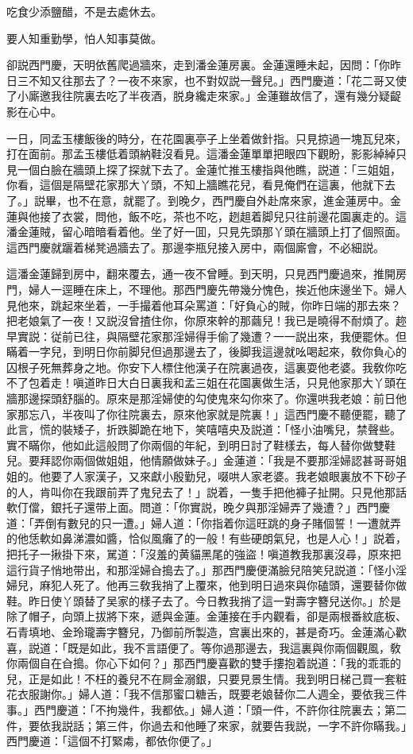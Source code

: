 吃食少添鹽醋，不是去處休去。

要人知重勤學，怕人知事莫做。

卻説西門慶，天明依舊爬過牆來，走到潘金蓮房裏。金蓮還睡未起，因問：「你昨日三不知又往那去了？一夜不來家，也不對奴説一聲兒。」西門慶道：「花二哥又使了小廝邀我往院裏去吃了半夜酒，脱身纔走來家。」金蓮雖故信了，還有幾分疑齪影在心中。

一日，同孟玉樓飯後的時分，在花園裏亭子上坐着做針指。只見掠過一塊瓦兒來，打在面前。那孟玉樓低着頭納鞋沒看見。這潘金蓮單單把眼四下觀盼，影影綽綽只見一個白臉在牆頭上探了探就下去了。金蓮忙推玉樓指與他瞧，説道：「三姐姐，你看，這個是隔壁花家那大丫頭，不知上牆瞧花兒，看見俺們在這裏，他就下去了。」説畢，也不在意，就罷了。到晚夕，西門慶自外赴席來家，進金蓮房中。金蓮與他接了衣裳，問他，飯不吃，茶也不吃，趔趄着脚兒只往前邊花園裏走的。這潘金蓮賊，留心暗暗看着他。坐了好一囬，只見先頭那丫頭在牆頭上打了個照面。這西門慶就躧着梯凳過牆去了。那邊李瓶兒接入房中，兩個廝會，不必細説。

這潘金蓮歸到房中，翻來覆去，通一夜不曾睡。到天明，只見西門慶過來，推開房門，婦人一逕睡在床上，不理他。那西門慶先帶幾分愧色，挨近他床邊坐下。婦人見他來，跳起來坐着，一手撮着他耳朵罵道：「好負心的賊，你昨日端的那去來？把老娘氣了一夜！又説沒曾揸住你，你原來幹的那繭兒！我已是曉得不耐煩了。趂早實説：従前已往，與隔壁花家那淫婦得手偷了幾遭？一一説出來，我便罷休。但瞞着一字兒，到明日你前脚兒但過那邊去了，後脚我這邊就吆喝起來，敎你負心的囚根子死無葬身之地。你安下人標住他漢子在院裏過夜，這裏耍他老婆。我敎你吃不了包着走！嗔道昨日大白日裏我和孟三姐在花園裏做生活，只見他家那大丫頭在牆那邊探頭舒腦的。原來是那淫婦使的勾使鬼來勾你來了。你還哄我老娘：前日他家那忘八，半夜叫了你往院裏去，原來他家就是院裏！」這西門慶不聽便罷，聽了此言，慌的裝矮子，折跌脚跪在地下，笑嘻嘻央及説道：「怪小油嘴兒，禁聲些。實不瞞你，他如此這般問了你兩個的年紀，到明日討了鞋樣去，每人替你做雙鞋兒。要拜認你兩個做姐姐，他情願做妹子。」金蓮道：「我是不要那淫婦認甚哥哥姐姐的。他要了人家漢子，又來獻小殷勤兒，啜哄人家老婆。我老娘眼裏放不下砂子的人，肯叫你在我跟前弄了鬼兒去了！」説着，一隻手把他褲子扯開。只見他那話軟仃儅，銀托子還带上面。問道：「你實説，晚夕與那淫婦弄了幾遭？」西門慶道：「弄倒有數兒的只一遭。」婦人道：「你指着你這旺跳的身子賭個誓！一遭就弄的他恁軟如鼻涕濃如醬，恰似風癱了的一般！有些硬朗氣兒，也是人心！」説着，把托子一揪掛下來，駡道：「沒羞的黄貓黑尾的強盜！嗔道教我那裏沒尋，原來把這行貨子悄地带出，和那淫婦㒲搗去了。」那西門慶便滿臉兒陪笑兒説道：「怪小淫婦兒，麻犯人死了。他再三敎我捎了上覆來，他到明日過來與你磕頭，還要替你做鞋。昨日使丫頭替了吴家的樣子去了。今日教我捎了這一對壽字簪兒送你。」於是除了帽子，向頭上拔將下來，遞與金蓮。金蓮接在手内觀看，卻是兩根番紋底板、石青填地、金玲瓏壽字簪兒，乃御前所製造，宫裏出來的，甚是奇巧。金蓮滿心歡喜，説道：「既是如此，我不言語便了。等你過那邊去，我這裏與你兩個觀風，敎你兩個自在㒲搗。你心下如何？」那西門慶喜歡的雙手摟抱着説道：「我的乖乖的兒，正是如此！不枉的養兒不在屙金溺銀，只要見景生情。我到明日梯己買一套粧花衣服謝你。」婦人道：「我不信那蜜口糖舌，既要老娘替你二人週全，要依我三件事。」西門慶道：「不拘幾件，我都依。」婦人道：「頭一件，不許你往院裏去；第二件，要依我説話；第三件，你過去和他睡了來家，就要告我説，一字不許你瞞我。」西門慶道：「這個不打緊䖏，都依你便了。」

